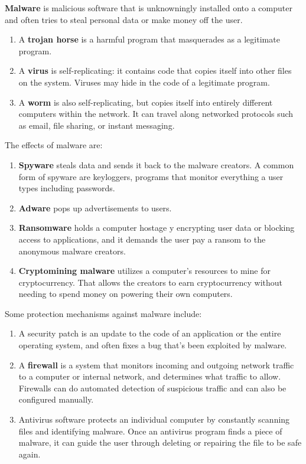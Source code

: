 \documentclass{article}
\begin{document}
  \begin{definition}
  \textbf{Malware} is malicious software that is unknowningly installed onto a computer and often tries to steal personal data or make money off the user. 
  \begin{enumerate}
      \item A \textbf{trojan horse} is a harmful program that masquerades as a legitimate program. 
      \item A \textbf{virus} is self-replicating: it contains code that copies itself into other files on the system. Viruses may hide in the code of a legitimate program. 
      \item A \textbf{worm} is also self-replicating, but copies itself into entirely different computers within the network. It can travel along networked protocols such as email, file sharing, or instant messaging. 
  \end{enumerate}
  The effects of malware are: 
  \begin{enumerate}
      \item \textbf{Spyware} steals data and sends it back to the malware creators. A common form of spyware are keyloggers, programs that monitor everything a user types including passwords. 
      \item \textbf{Adware} pops up advertisements to users.
      \item \textbf{Ransomware} holds a computer hostage y encrypting user data or blocking access to applications, and it demands the user pay a ransom to the anonymous malware creators. 
      \item \textbf{Cryptomining malware} utilizes a computer's resources to mine for cryptocurrency. That allows the creators to earn cryptocurrency without needing to spend money on powering their own computers.
  \end{enumerate}
  \end{definition}

  Some protection mechanisms against malware include: 
  \begin{enumerate}
      \item A security patch is an update to the code of an application or the entire operating system, and often fixes a bug that's been exploited by malware. 
      \item A \textbf{firewall} is a system that monitors incoming and outgoing network traffic to a computer or internal network, and determines what traffic to allow. Firewalls can do automated detection of suspicious traffic and can also be configured manually. 
      \item Antivirus software protects an individual computer by constantly scanning files and identifying malware. Once an antivirus program finds a piece of malware, it can guide the user through deleting or repairing the file to be safe again. 
  \end{enumerate}
\end{document}
